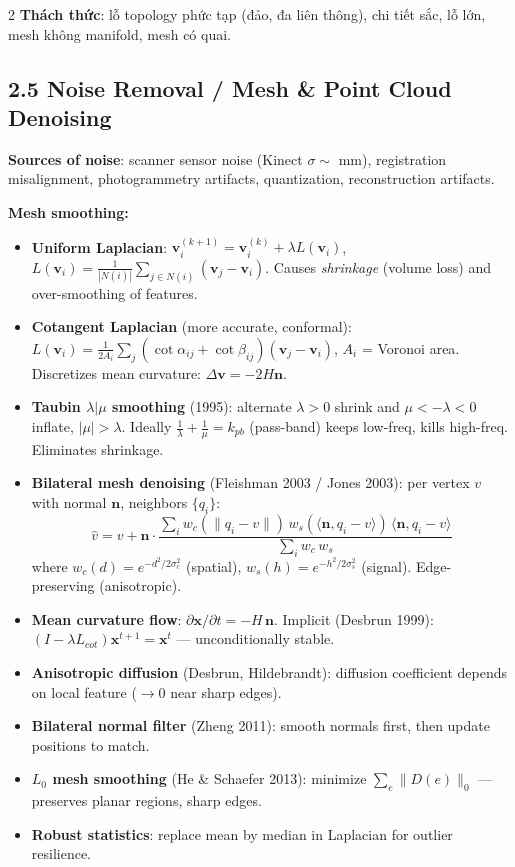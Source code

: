 \begin{paracol}{2}
\textbf{Thách thức}: lỗ topology phức tạp (đảo, đa liên thông), chi tiết sắc, lỗ lớn, mesh không manifold, mesh có quai.

\switchcolumn*

\subsection*{2.5 Noise Removal / Mesh \& Point Cloud Denoising}

\textbf{Sources of noise}: scanner sensor noise (Kinect $\sigma\!\sim\!$ mm), registration misalignment, photogrammetry artifacts, quantization, reconstruction artifacts.

\textbf{Mesh smoothing:}
\begin{itemize}[leftmargin=*,nosep]
  \item \textbf{Uniform Laplacian}: $\mathbf v_i^{(k+1)} = \mathbf v_i^{(k)} + \lambda L(\mathbf v_i)$, $L(\mathbf v_i) = \tfrac{1}{|N(i)|}\sum_{j\in N(i)}(\mathbf v_j - \mathbf v_i)$. Causes \emph{shrinkage} (volume loss) and over-smoothing of features.
  \item \textbf{Cotangent Laplacian} (more accurate, conformal): $L(\mathbf v_i) = \tfrac{1}{2A_i}\sum_j(\cot\alpha_{ij}+\cot\beta_{ij})(\mathbf v_j-\mathbf v_i)$, $A_i$ = Voronoi area. Discretizes mean curvature: $\Delta\mathbf v = -2H\mathbf n$.
  \item \textbf{Taubin $\lambda|\mu$ smoothing} (1995): alternate $\lambda>0$ shrink and $\mu<-\lambda<0$ inflate, $|\mu|>\lambda$. Ideally $\tfrac{1}{\lambda}+\tfrac{1}{\mu}=k_{pb}$ (pass-band) keeps low-freq, kills high-freq. Eliminates shrinkage.
  \item \textbf{Bilateral mesh denoising} (Fleishman 2003 / Jones 2003): per vertex $v$ with normal $\mathbf n$, neighbors $\{q_i\}$:
    $$\hat v = v + \mathbf n \cdot \frac{\sum_i w_c(\|q_i-v\|)\,w_s(\langle\mathbf n,q_i-v\rangle)\,\langle\mathbf n,q_i-v\rangle}{\sum_i w_c\,w_s}$$
    where $w_c(d)=e^{-d^2/2\sigma_c^2}$ (spatial), $w_s(h)=e^{-h^2/2\sigma_s^2}$ (signal). Edge-preserving (anisotropic).
  \item \textbf{Mean curvature flow}: $\partial \mathbf x/\partial t = -H\,\mathbf n$. Implicit (Desbrun 1999): $(I-\lambda L_{cot})\mathbf x^{t+1}=\mathbf x^t$ — unconditionally stable.
  \item \textbf{Anisotropic diffusion} (Desbrun, Hildebrandt): diffusion coefficient depends on local feature ($\to 0$ near sharp edges).
  \item \textbf{Bilateral normal filter} (Zheng 2011): smooth normals first, then update positions to match.
  \item \textbf{$L_0$ mesh smoothing} (He \& Schaefer 2013): minimize $\sum_e \|D(e)\|_0$ — preserves planar regions, sharp edges.
  \item \textbf{Robust statistics}: replace mean by median in Laplacian for outlier resilience.
\end{itemize}


\end{paracol}

